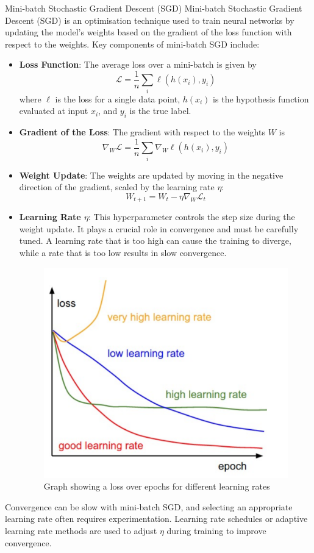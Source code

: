 \begin{definitionbox}{Mini-batch Stochastic Gradient Descent (SGD)}
Mini-batch Stochastic Gradient Descent (SGD) is an optimisation technique used to train neural networks by updating the model's weights based on the gradient of the loss function with respect to the weights. Key components of mini-batch SGD include:

\begin{itemize}
    \item \textbf{Loss Function}: The average loss over a mini-batch is given by
    \[ \mathcal{L} = \frac{1}{n} \sum_{i} \ell(h(x_i), y_i) \]
    where \( \ell \) is the loss for a single data point, \( h(x_i) \) is the hypothesis function evaluated at input \( x_i \), and \( y_i \) is the true label.

    \item \textbf{Gradient of the Loss}: The gradient with respect to the weights \( W \) is
    \[ \nabla_W \mathcal{L} = \frac{1}{n} \sum_{i} \nabla_W \ell(h(x_i), y_i) \]

    \item \textbf{Weight Update}: The weights are updated by moving in the negative direction of the gradient, scaled by the learning rate \( \eta \):
    \[ W_{t+1} = W_t - \eta \nabla_W \mathcal{L}_t \]

    \item \textbf{Learning Rate \( \eta \)}: This hyperparameter controls the step size during the weight update. It plays a crucial role in convergence and must be carefully tuned. A learning rate that is too high can cause the training to diverge, while a rate that is too low results in slow convergence.

    \begin{figure}[H]
    \centering
    \includegraphics[width=0.5\linewidth]{img/sgd_learnrate.png}
    \caption{Graph showing a loss over epochs for different learning rates}
    \end{figure}
\end{itemize}

Convergence can be slow with mini-batch SGD, and selecting an appropriate learning rate often requires experimentation. Learning rate schedules or adaptive learning rate methods are used to adjust \( \eta \) during training to improve convergence.
\end{definitionbox}



